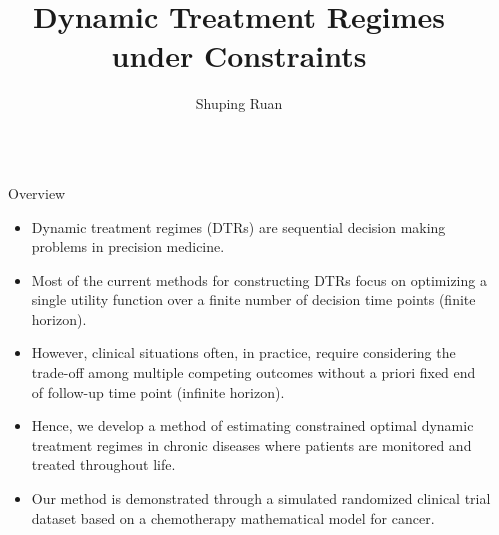 \documentclass[final,hyperref={pdfpagelabels=false}]{beamer}
\title{\huge Dynamic Treatment Regimes under Constraints} %
\author{Shuping Ruan} %
\institute{Department of Statistics, North Carolina State University} %
\begin{document}

\begin{frame}[t] %

\begin{columns}[t] %

\begin{column}{.02\textwidth}\end{column} %

\begin{column}{.465\textwidth} %


\begin{block}{Overview}
	\begin{itemize}
		\item Dynamic treatment regimes (DTRs) are sequential decision making problems in precision medicine.
		\item Most of the current methods for constructing DTRs focus on optimizing a single utility function over a finite number of decision time points (finite horizon).
		\item However, clinical situations often, in practice, require considering the trade-off among multiple competing outcomes without a priori fixed end of follow-up time point (infinite horizon). 
		\item  Hence, we develop a method of estimating constrained optimal dynamic treatment regimes in chronic diseases where patients are monitored and treated throughout life. 
		\item  Our method is demonstrated through a simulated randomized clinical trial dataset based on a chemotherapy mathematical model for cancer.
	\end{itemize}
\end{block}

            

\end{column}
\end{columns}
\end{frame}
\end{document}
